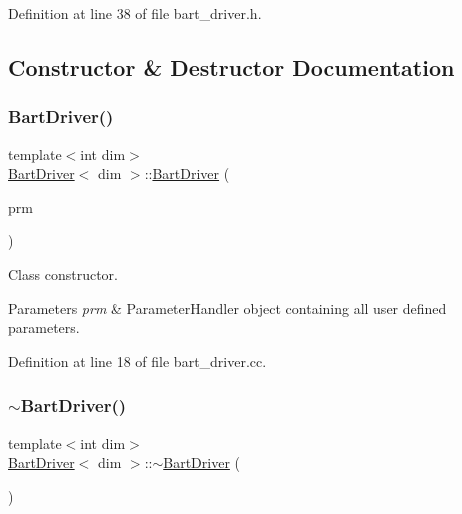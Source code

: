 Definition at line 38 of file bart\+\_\+driver.\+h.



\subsection{Constructor \& Destructor Documentation}
\mbox{\label{class_bart_driver_acad3b3200543d46ab9e4c78b860f822c}} 
\subsubsection{\texorpdfstring{Bart\+Driver()}{BartDriver()}}
{\footnotesize\ttfamily template$<$int dim$>$ \\
\hyperlink{class_bart_driver}{Bart\+Driver}$<$ dim $>$\+::\hyperlink{class_bart_driver}{Bart\+Driver} (\begin{DoxyParamCaption}\item[{Parameter\+Handler \&}]{prm }\end{DoxyParamCaption})}

Class constructor.


\begin{DoxyParams}{Parameters}
{\em prm} & Parameter\+Handler object containing all user defined parameters. \\
\hline
\end{DoxyParams}


Definition at line 18 of file bart\+\_\+driver.\+cc.

\mbox{\label{class_bart_driver_aa89fe626d99cb4013b83d5e99698a9f3}} 
\subsubsection{\texorpdfstring{$\sim$\+Bart\+Driver()}{~BartDriver()}}
{\footnotesize\ttfamily template$<$int dim$>$ \\
\hyperlink{class_bart_driver}{Bart\+Driver}$<$ dim $>$\+::$\sim$\hyperlink{class_bart_driver}{Bart\+Driver} (\begin{DoxyParamCaption}{ }\end{DoxyParamCaption})}



